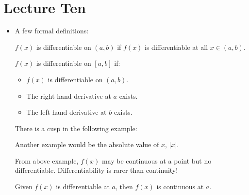 \section{Lecture Ten}
\begin{itemize}
    \item A few formal definitions:
    \begin{definition}
        $f(x)$ is differentiable on $(a,b)$ if $f(x)$ is differentiable at all $x\in (a,b)$.
    \end{definition}
    \begin{definition}
        $f(x)$ is differentiable on $[a,b]$ if:
        \begin{itemize}
            \item $f(x)$ is differentiable on $(a,b)$.
            \item The right hand derivative at $a$ exists.
            \item The left hand derivative at $b$ exists.
        \end{itemize}
    \end{definition}
    \begin{example}
    There is a cusp in the following example:
    \begin{center}
    \end{center}
    Another example would be the absolute value of $x$, $|x|$.
    \end{example}
    \begin{warning}
        From above example, $f(x)$ may be continuous at a point but no differentiable. Differentiability is rarer than continuity!
    \end{warning}
    \begin{theorem}
        Given $f(x)$ is differentiable at $a$, then $f(x)$ is continuous at $a$.

\end{theorem}
\end{itemize}
